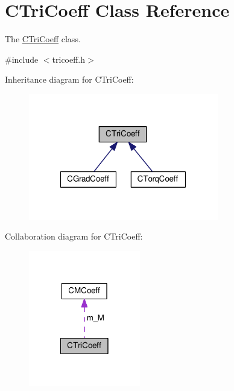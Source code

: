 \hypertarget{classCTriCoeff}{\section{C\-Tri\-Coeff Class Reference}
\label{classCTriCoeff}
}


The \hyperlink{classCTriCoeff}{C\-Tri\-Coeff} class.  




{\ttfamily \#include $<$tricoeff.\-h$>$}



Inheritance diagram for C\-Tri\-Coeff\-:
\nopagebreak
\begin{figure}[H]
\begin{center}
\leavevmode
\includegraphics[width=235pt]{classCTriCoeff__inherit__graph}
\end{center}
\end{figure}


Collaboration diagram for C\-Tri\-Coeff\-:\nopagebreak
\begin{figure}[H]
\begin{center}
\leavevmode
\includegraphics[width=138pt]{classCTriCoeff__coll__graph}
\end{center}
\end{figure}
